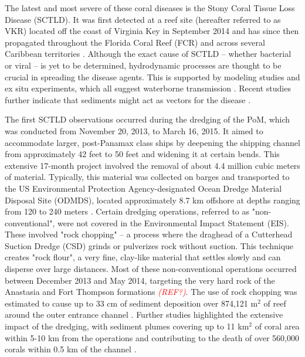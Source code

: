 \documentclass[preprint,12pt,authoryear]{elsarticle}
\newcommand{\emphc}[1]{\emph{\textcolor{red}{#1}}}
\begin{document}
The latest and most severe of these coral diseases is the Stony Coral Tissue Loss Disease (SCTLD). It was first detected at a reef site (hereafter referred to as VKR) located off the coast of Virginia Key in September 2014 \citep{precht2016unprecedented} and has since then propagated throughout the Florida Coral Reef (FCR) and across several Caribbean territories \citep{muller2020spatial,dobbelaere2022connecting, kramer2019map, meiling2021variable, estrada2021effects,heres2021ecological}. Although the exact cause of SCTLD -- whether bacterial or viral -- is yet to be determined, hydrodynamic processes are thought to be crucial in spreading the disease agents. This is supported by modeling studies and ex situ experiments, which all suggest waterborne transmission \citep{aeby2019pathogenesis,dobbelaere2020coupled,eaton2021measuring, meiling2021variable}. Recent studies further indicate that sediments might act as vectors for the disease \citep{rosales2020rhodobacterales, studivan2022reef}.



The first SCTLD observations occurred during the dredging of the PoM, which was conducted from November 20, 2013, to March 16, 2015. It aimed to accommodate larger, post-Panamax class ships by deepening the shipping channel from approximately 42 feet to 50 feet and widening it at certain bends. This extensive 17-month project involved the removal of about 4.4 million cubic meters of material. Typically, this material was collected on barges and transported to the US Environmental Protection Agency-designated Ocean Dredge Material Disposal Site (ODMDS), located approximately 8.7 km offshore at depths ranging from 120 to 240 meters \citep{noaa2023sedimentation}. Certain dredging operations, referred to as "non-conventional", were not covered in the Environmental Impact Statement (EIS). These involved "rock chopping" -- a process where the draghead of a Cutterhead Suction Dredge (CSD) grinds or pulverizes rock without suction. This technique creates "rock flour", a very fine, clay-like material that settles slowly and can disperse over large distances. Most of these non-conventional operations occurred between December 2013 and May 2014, targeting the very hard rock of the Anastasia and Fort Thompson formations \emphc{(REF?)}. The use of rock chopping was estimated to cause up to 33 cm of sediment deposition over 874,121 m$^2$ of reef around the outer entrance channel \citep{usace2017}. Further studies highlighted the extensive impact of the dredging, with sediment plumes covering up to 11 km$^2$ of coral area within 5-10 km from the operations \citep{barnes2015sediment} and contributing to the death of over 560,000 corals within 0.5 km of the channel \citep{cunning2019extensive}.
\end{document}
